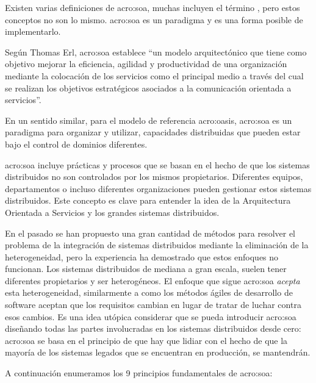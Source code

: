 Existen varias definiciones de \gls{acro:soa}, muchas incluyen el término , pero estos conceptos no son lo mismo. \gls{acro:soa} es un paradigma y  es una forma posible de implementarlo.

Según Thomas Erl\cite{principlesofdesign:erl}, \gls{acro:soa} establece ``un modelo arquitectónico que tiene como objetivo mejorar la eficiencia, agilidad y productividad de una organización mediante la colocación de los servicios como el principal medio a través del cual se realizan los objetivos estratégicos asociados a la comunicación orientada a servicios''.

En un sentido similar, para el modelo de referencia \gls{acro:oasis}, \gls{acro:soa} es un paradigma para organizar y utilizar, capacidades distribuidas que pueden estar bajo el control de dominios diferentes.

\gls{acro:soa} incluye prácticas y procesos que se basan en el hecho de que los sistemas distribuidos no son controlados por los mismos propietarios. Diferentes equipos, departamentos o incluso diferentes organizaciones pueden gestionar estos sistemas distribuidos. Este concepto es clave para entender la idea de la Arquitectura Orientada a Servicios y los grandes sistemas distribuidos.

En el pasado se han propuesto una gran cantidad de métodos para resolver el problema de la integración de sistemas distribuidos mediante la eliminación de la heterogeneidad, pero la experiencia ha demostrado que estos enfoques no funcionan\cite[p.~14]{josuttis2007}. Los sistemas distribuidos de mediana a gran escala, suelen tener diferentes propietarios y ser heterogéneos. El enfoque que sigue \gls{acro:soa} \textit{acepta} esta heterogeneidad, similarmente a como los métodos ágiles de desarrollo de software aceptan que los requisitos cambian en lugar de tratar de luchar contra esos cambios. Es una idea utópica considerar que se pueda introducir \gls{acro:soa} diseñando todas las partes involucradas en los sistemas distribuidos desde cero: \gls{acro:soa} se basa en el principio de que hay que lidiar con el hecho de que la mayoría de los sistemas legados que se encuentran en producción, se mantendrán\cite[p.~15]{josuttis2007}.

A continuación enumeramos los 9 principios fundamentales de \gls{acro:soa}:

